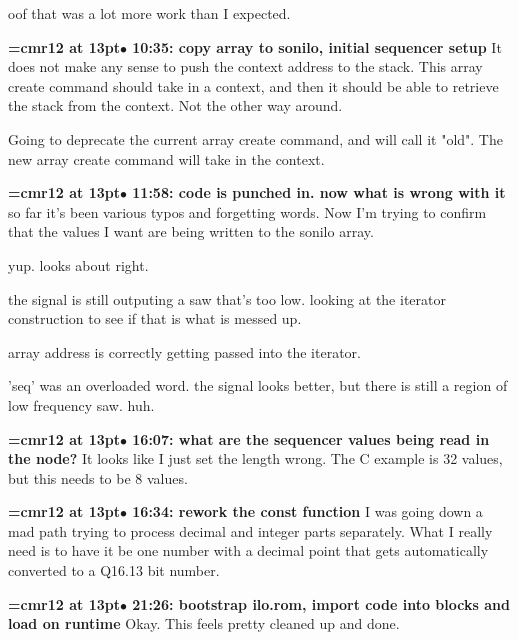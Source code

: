 oof that was a lot more work than I expected.
\par

{\smallskip\noindent\bf\font\titlefont=cmr12 at 13pt\titlefont $\bullet$ 10:35: copy array to sonilo, initial sequencer setup}\smallskip
It does not make any sense to push the context address to the stack. This array create command should take in a context, and then it should be able to retrieve the stack from the context. Not the other way around.
\par

Going to deprecate the current array create command, and will call it "old". The new array create command will take in the context.
\par

{\smallskip\noindent\bf\font\titlefont=cmr12 at 13pt\titlefont $\bullet$ 11:58: code is punched in. now what is wrong with it}\smallskip
so far it's been various typos and forgetting words. Now I'm trying to confirm that the values I want are being written to the sonilo array.
\par

yup. looks about right.
\par

the signal is still outputing a saw that's too low. looking at the iterator construction to see if that is what is messed up.
\par

array address is correctly getting passed into the iterator.
\par

'seq' was an overloaded word. the signal looks better, but there is still a region of low frequency saw. huh.
\par

{\smallskip\noindent\bf\font\titlefont=cmr12 at 13pt\titlefont $\bullet$ 16:07: what are the sequencer values being read in the node?}\smallskip
It looks like I just set the length wrong. The C example is 32 values, but this needs to be 8 values.
\par

{\smallskip\noindent\bf\font\titlefont=cmr12 at 13pt\titlefont $\bullet$ 16:34: rework the const function}\smallskip
I was going down a mad path trying to process decimal and integer parts separately. What I really need is to have it be one number with a decimal point that gets automatically converted to a Q16.13 bit number.
\par

{\smallskip\noindent\bf\font\titlefont=cmr12 at 13pt\titlefont $\bullet$ 21:26: bootstrap ilo.rom, import code into blocks and load on runtime}\smallskip
Okay. This feels pretty cleaned up and done.
\par


